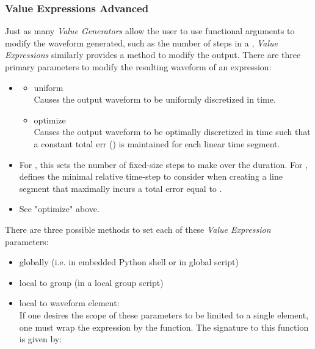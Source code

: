 \subsubsection{Value Expressions Advanced}
Just as many \textit{Value Generators} allow the user to use functional arguments to
modify the waveform generated, such as the number of steps in a ,
\textit{Value Expressions} similarly provides a method to modify the output.
%
There are three primary parameters to modify the resulting waveform of an
expression:
\begin{itemize}
  \item {}
    \begin{itemize}
    \item uniform\\
      Causes the output waveform to be uniformly discretized in time.
    \item optimize\\
      Causes the output waveform to be optimally discretized in time such that a
      constant total err () is maintained for each linear
      time segment.
    \end{itemize}
  \item {}
      For , this sets the number of fixed-size steps
      to make over the duration.
      For ,  defines the
      minimal relative time-step to consider when creating a line segment that
      maximally incurs a total error equal to .
  \item {}
      See "optimize" above.
\end{itemize}
%
There are three possible methods to set each of these \textit{Value Expression}
parameters:
\begin{itemize}
  \item globally (i.e. in embedded Python shell or in global script)
  \item local to group (in a local group script)
  \item local to waveform element:\\
    If one desires the scope of these parameters to be limited to a single
    element, one must wrap the expression by the  function.
    The signature to this function is given by:\\
\end{itemize}



